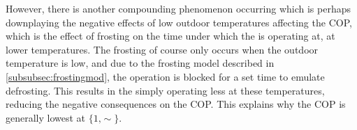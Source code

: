 However, there is another compounding phenomenon occurring which is perhaps downplaying the negative effects of low outdoor temperatures affecting the \ac{COP}, which is the effect of frosting on the time under which the \HP is operating at, at lower temperatures. The frosting of course only occurs when the outdoor temperature is low, and due to the frosting model described in \cref{subsubsec:frostingmod}, the \HP operation is blocked for a set time to emulate defrosting. This results in the \HP simply operating less at these temperatures, reducing the negative consequences on the \ac{COP}. This explains why the \ac{COP} is generally lowest at $\{1\text{,}\sim\}$. 
